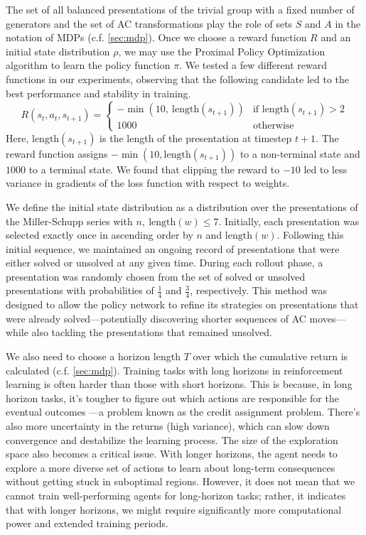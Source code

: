The set of all balanced presentations of the trivial group with a fixed number of generators and the set of AC transformations play the role of sets $S$ and $A$ in the notation of MDPs (c.f. \autoref{sec:mdp}). Once we choose a reward function $R$ and an initial state distribution $\rho$, we may use the Proximal Policy Optimization algorithm to learn the policy function $\pi$. We tested a few different reward functions in our experiments, observing that the following candidate led to the best performance and stability in training.
\[
R(s_{t}, a_{t}, s_{t+1}) = 
\begin{cases} 
-\min(10, \ \text{length}(s_{t+1})) & \text{if length}(s_{t+1}) > 2 \\
1000 & \text{otherwise } 
\end{cases}
\]
Here, $\text{length}(s_{t+1})$ is the length of the presentation at timestep $t+1$. The reward function assigns $-\min(10, \text{length}(s_{t+1}))$ to a non-terminal state and $1000$ to a terminal state. We found that clipping the reward to $-10$ led to less variance in gradients of the loss function with respect to weights.
\newline

We define the initial state distribution as a distribution over the presentations of the Miller-Schupp series with $n, \ \text{length}(w) \leq 7$. Initially, each presentation was selected exactly once in ascending order by $n$ and $\text{length}(w)$. Following this initial sequence, we maintained an ongoing record of presentations that were either solved or unsolved at any given time. During each rollout phase, a presentation was randomly chosen from the set of solved or unsolved presentations with probabilities of  $\frac{1}{4}$ and $\frac{3}{4}$, respectively. This method was designed to allow the policy network to refine its strategies on presentations that were already solved—potentially discovering shorter sequences of AC moves—while also tackling the presentations that remained unsolved.
\newline

We also need to choose a horizon length $T$ over which the cumulative return is calculated (c.f. \autoref{sec:mdp}). Training tasks with long horizons in reinforcement learning is often harder than those with short horizons. This is because, in long horizon tasks, it's tougher to figure out which actions are responsible for the eventual outcomes —a problem known as the credit assignment problem. There's also more uncertainty in the returns (high variance), which can slow down convergence and destabilize the learning process. The size of the exploration space also becomes a critical issue. With longer horizons, the agent needs to explore a more diverse set of actions to learn about long-term consequences without getting stuck in suboptimal regions. However, it does not mean that we cannot train well-performing agents for long-horizon tasks; rather, it indicates that with longer horizons, we might require significantly more computational power and extended training periods.
\newline

